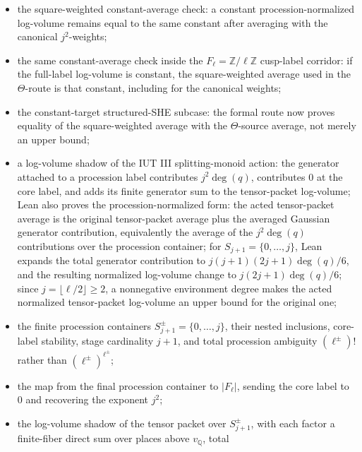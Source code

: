\documentclass[11pt]{article}
\begin{document}
\begin{itemize}
  Lean proves the total \(j^2\)-mass is positive from the \(j=1\) contribution
  and therefore constructs the profile without an external positivity premise;
  it also proves
  \(6\sum_{j\in\mathbb{Z}/\ell\mathbb{Z}}j_{\mathrm{rep}}^2
   =(\ell-1)\ell(2(\ell-1)+1)\), hence the corresponding average formula after
  division by \(\ell\);
\item the square-weighted constant-average check:
  a constant procession-normalized log-volume remains equal to the same
  constant after averaging with the canonical \(j^2\)-weights;
\item the same constant-average check inside the
  \(F_\ell=\mathbb{Z}/\ell\mathbb{Z}\) cusp-label corridor:
  if the full-label log-volume is constant, the square-weighted average used in
  the \(\Theta\)-route is that constant, including for the canonical weights;
\item the constant-target structured-SHE subcase:
  the formal route now proves equality of the square-weighted average with the
  \(\Theta\)-source average, not merely an upper bound;
\item a log-volume shadow of the IUT III splitting-monoid action: the generator
  attached to a procession label contributes \(j^2\deg(q)\), contributes \(0\) at
  the core label, and adds its finite generator sum to the tensor-packet
  log-volume; Lean also proves the procession-normalized form: the acted
  tensor-packet average is the original tensor-packet average plus the averaged
  Gaussian generator contribution, equivalently the average of the
  \(j^2\deg(q)\) contributions over the procession container; for
  \(S_{j+1}=\{0,\ldots,j\}\), Lean expands the total generator contribution to
  \(j(j+1)(2j+1)\deg(q)/6\), and the resulting normalized log-volume change to
  \(j(2j+1)\deg(q)/6\); since \(j=\lfloor\ell/2\rfloor\ge2\), a nonnegative
  environment degree makes the acted normalized tensor-packet log-volume an
  upper bound for the original one;
\item the finite procession containers
  \(S^\pm_{j+1}=\{0,\ldots,j\}\), their nested inclusions, core-label stability,
  stage cardinality \(j+1\), and total procession ambiguity \((\ell^\pm)!\)
  rather than \((\ell^\pm)^{\ell^\pm}\);
\item the map from the final procession container to \(|F_\ell|\), sending the
  core label to \(0\) and recovering the exponent \(j^2\);
\item the log-volume shadow of the tensor packet over \(S^\pm_{j+1}\), with
  each factor a finite-fiber direct sum over places above \(v_\mathbb{Q}\), total

\end{itemize}
\end{document}
